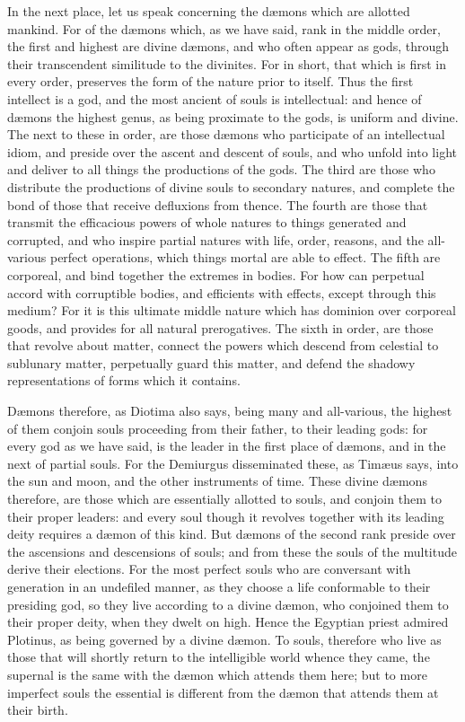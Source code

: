 \documentclass[12pt]{article}
\begin{document}
In the next place, let us speak concerning the d{\ae}mons which are allotted
mankind. For of the d{\ae}mons which, as we have said, rank in the middle
order, the first and highest are divine d{\ae}mons, and who often appear as
gods, through their transcendent similitude to the divinites. For in short,
that which is first in every order, preserves the form of the nature prior to
itself. Thus the first intellect is a god, and the most ancient of souls is
intellectual: and hence of d{\ae}mons the highest genus, as being proximate to
the gods, is uniform and divine. The next to these in order, are those
d{\ae}mons who participate of an intellectual idiom, and preside over the
ascent and descent of souls, and who unfold into light and deliver to all
things the productions of the gods. The third are those who distribute the
productions of divine souls to secondary natures, and complete the bond of
those that receive defluxions from thence. The fourth are those that transmit
the efficacious powers of whole natures to things generated and corrupted, and
who inspire partial natures with life, order, reasons, and the all-various
perfect operations, which things mortal are able to effect. The fifth are
corporeal, and bind together the extremes in bodies. For how can perpetual
accord with corruptible bodies, and efficients with effects, except through
this medium? For it is this ultimate middle nature which has dominion over
corporeal goods, and provides for all natural prerogatives. The sixth in order,
are those that revolve about matter, connect the powers which descend from
celestial to sublunary matter, perpetually guard this matter, and defend the
shadowy representations of forms which it contains.

D{\ae}mons therefore, as Diotima also says, being many and all-various, the
highest of them conjoin souls proceeding from their father, to their leading
gods: for every god as we have said, is the leader in the first place of
d{\ae}mons, and in the next of partial souls. For the Demiurgus disseminated
these, as Tim{\ae}us says, into the sun and moon, and the other instruments of
time. These divine d{\ae}mons therefore, are those which are essentially
allotted to souls, and conjoin them to their proper leaders: and every soul
though it revolves together with its leading deity requires a d{\ae}mon of this
kind. But d{\ae}mons of the second rank preside over the ascensions and
descensions of souls; and from these the souls of the multitude derive their
elections. For the most perfect souls who are conversant with generation in an
undefiled manner, as they choose a life conformable to their presiding god, so
they live according to a divine d{\ae}mon, who conjoined them to their proper
deity, when they dwelt on high. Hence the Egyptian priest admired Plotinus, as
being governed by a divine d{\ae}mon. To souls, therefore who live as those
that will shortly return to the intelligible world whence they came, the
supernal is the same with the d{\ae}mon which attends them here; but to more
imperfect souls the essential is different from the d{\ae}mon that attends them
at their birth.
\end{document}
